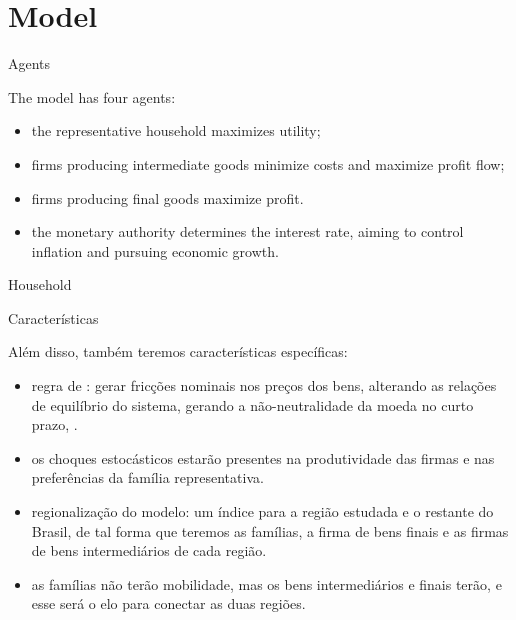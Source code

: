 \documentclass[
presentation.tex
]{subfiles}
\begin{document}
\section{Model}
	
	
	\begin{frame}{Agents}

	The model has four agents:
	\begin{itemize}
	
	\item the representative household maximizes utility;
	
	\item firms producing intermediate goods minimize costs and maximize profit flow;
	
	\item firms producing final goods maximize profit.

	\item the monetary authority determines the interest rate, aiming to control inflation and pursuing economic growth.
	
	\end{itemize}		

	\end{frame}


	\begin{frame}{Household}
		
		
		
		
	\end{frame}


\begin{frame}{Características}

Além disso, também teremos características específicas:

\begin{itemize}
	\item regra de \textcite{calvo_staggered_1983}: gerar fricções nominais nos preços dos bens, alterando as relações de equilíbrio do sistema, gerando a não-neutralidade da moeda no curto prazo, \textcite[p.191]{costa_junior_understanding_2016}.
	
	\item os choques estocásticos estarão presentes na produtividade das firmas e nas preferências da família representativa.
	
	\item regionalização do modelo: um índice para a região estudada e o restante do Brasil, de tal forma que teremos as famílias, a firma de bens finais e as firmas de bens intermediários de cada região.
	
	\item as famílias não terão mobilidade, mas os bens intermediários e finais terão, e esse será o elo para conectar as duas regiões.
\end{itemize}

\end{frame}	
\end{document}
